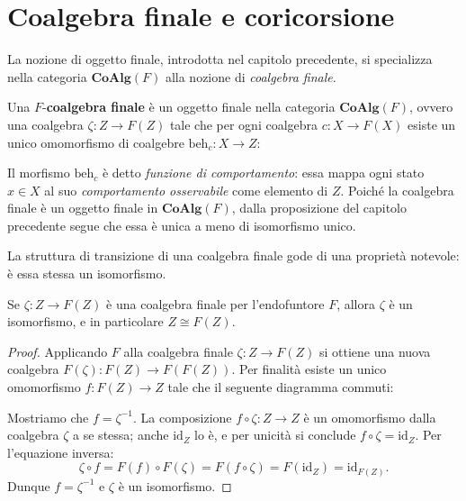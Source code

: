 \section{Coalgebra finale e coricorsione}

La nozione di oggetto finale, introdotta nel capitolo precedente, si specializza nella categoria \(\mathbf{CoAlg}(F)\) alla nozione di \textit{coalgebra finale}.

\begin{definition}
  Una \(F\)-\textbf{coalgebra finale} è un oggetto finale nella categoria \(\mathbf{CoAlg}(F)\), ovvero una coalgebra \(\zeta : Z \to F(Z)\) tale che per ogni coalgebra \(c : X \to F(X)\) esiste un unico omomorfismo di coalgebre \(\mathrm{beh}_c : X \to Z\):
  \begin{center}
  \end{center}
\end{definition}

Il morfismo \(\mathrm{beh}_c\) è detto \textit{funzione di comportamento}: essa mappa ogni stato \(x \in X\) al suo \textit{comportamento osservabile} come elemento di \(Z\). Poiché la coalgebra finale è un oggetto finale in \(\mathbf{CoAlg}(F)\), dalla proposizione del capitolo precedente segue che essa è unica a meno di isomorfismo unico.

La struttura di transizione di una coalgebra finale gode di una proprietà notevole: è essa stessa un isomorfismo.

\begin{lemma}
  Se \(\zeta : Z \to F(Z)\) è una coalgebra finale per l'endofuntore \(F\), allora \(\zeta\) è un isomorfismo, e in particolare \(Z \cong F(Z)\).
\end{lemma}

\begin{proof}
  Applicando \(F\) alla coalgebra finale \(\zeta : Z \to F(Z)\) si ottiene una nuova coalgebra \(F(\zeta) : F(Z) \to F(F(Z))\). Per finalità esiste un unico omomorfismo \(f : F(Z) \to Z\) tale che il seguente diagramma commuti:
  \begin{center}
  \end{center}
  Mostriamo che \(f = \zeta^{-1}\). La composizione \(f \circ \zeta : Z \to Z\) è un omomorfismo dalla coalgebra \(\zeta\) a se stessa; anche \(\mathrm{id}_Z\) lo è, e per unicità si conclude \(f \circ \zeta = \mathrm{id}_Z\). Per l'equazione inversa:
  \[
    \zeta \circ f = F(f) \circ F(\zeta) = F(f \circ \zeta) = F(\mathrm{id}_Z) = \mathrm{id}_{F(Z)}.
  \]
  Dunque \(f = \zeta^{-1}\) e \(\zeta\) è un isomorfismo.
\end{proof}

